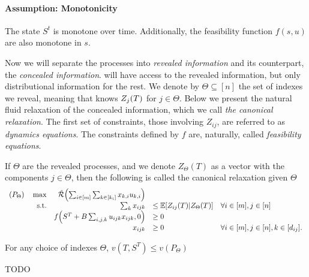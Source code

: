 \documentclass[letterpaper,11pt]{article}
\begin{document}
\paragraph{Assumption: Monotonicity}
The state $S^t$ is monotone over time.
Additionally, the feasibility function $f(s,u)$ are also monotone in $s$.

Now we will separate the processes into \emph{revealed information} and its counterpart, the \emph{concealed information}.
\off will have access to the revealed information, but only distributional information for the rest.
We denote by $\Theta\subseteq [n]$ the set of indexes we reveal, meaning that \off knows $Z_j(T)$ for $j\in\Theta$.
Below we present the natural fluid relaxation of the concealed information, which we call \emph{the canonical relaxation}.
The first set of constraints, those involving $Z_{ij}$, are referred to as \emph{dynamics equations}.
The constraints defined by $f$ are, naturally, called \emph{feasibility equations}.

\begin{definition}
If $\Theta$ are the revealed processes, and we denote $Z_\Theta(T)$ as a vector with the components $j\in\Theta$, then the following is called the canonical relaxation given $\Theta$
\begin{equation}\label{eq:theta_relaxation}
\begin{array}{rrll}
(P_\Theta)\quad \max  & \tilde \Re\prn*{\sum_{i\in [m]}\sum_{k\in [k_i]}x_{k,i}u_{k,i}} \\
\text{s.t.}&  \sum_k x_{ijk} & \leq \E[Z_{ij}(T)| Z_\Theta(T) ]  &\forall i\in[m], j\in[n] \\
& f\prn*{S^\T+B\sum_{i,j,k}u_{ijk}x_{ijk},0}&\geq 0  \\
& x_{ijk}&\geq 0 & \forall i\in [m], j\in [n], k\in [d_{ij}] .
\end{array}
\end{equation}
\end{definition}

\begin{proposition}
For any choice of indexes $\Theta$, $v(T,S^T)\leq v(P_\Theta)$	
\end{proposition}

\begin{definition}
	TODO
\end{definition}



\end{document}

